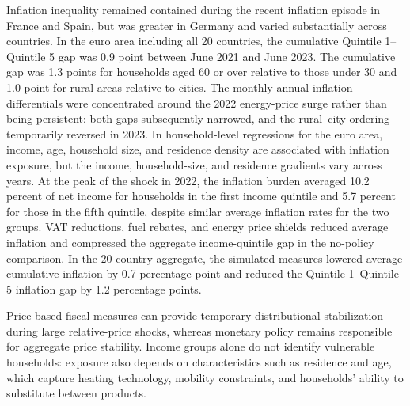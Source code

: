 \documentclass[11pt]{article}
\begin{document}
Inflation inequality remained contained during the recent inflation episode in France and
Spain, but was greater in Germany and varied substantially across countries. In the euro area
including all 20 countries, the cumulative Quintile 1--Quintile 5 gap was 0.9 point between June
2021 and June 2023. The cumulative gap was 1.3
points for households aged 60 or over relative to those under 30 and 1.0 point for rural areas
relative to cities. The monthly annual inflation differentials were concentrated around the 2022
energy-price surge rather than being persistent: both gaps subsequently narrowed, and the rural--city
ordering temporarily reversed in 2023. In household-level regressions for the euro area,
income, age, household size, and residence density are associated with inflation exposure, but the
income, household-size, and residence gradients vary across years.
At the peak of the shock in 2022, the inflation burden averaged 10.2 percent of net income for households in the
first income quintile and 5.7 percent for those in the fifth quintile, despite similar
average inflation rates for the two groups.
VAT reductions, fuel rebates, and energy price shields reduced average inflation and compressed the
aggregate income-quintile gap in the no-policy comparison. In the 20-country aggregate, the
simulated measures lowered average cumulative inflation by 0.7 percentage point and reduced the
Quintile 1--Quintile 5 inflation gap by 1.2 percentage points.


Price-based fiscal measures can provide temporary distributional stabilization during large
relative-price shocks, whereas monetary policy remains responsible for aggregate price stability.
Income groups alone do not identify vulnerable households: exposure also depends on characteristics
such as residence and age, which capture heating technology, mobility constraints, and households'
ability to substitute between products.


\end{document}
